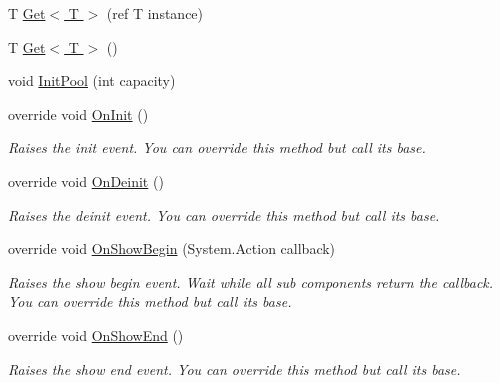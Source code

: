 \begin{DoxyCompactItemize}
\item 
T \hyperlink{class_unity_engine_1_1_u_i_1_1_windows_1_1_components_1_1_linker_component_a5469f90dba68bd5de121e36aac17409c}{Get$<$ T $>$} (ref T instance)
\item 
T \hyperlink{class_unity_engine_1_1_u_i_1_1_windows_1_1_components_1_1_linker_component_ab499a114ddf3ed1b9b5028811c0cbdd8}{Get$<$ T $>$} ()
\item 
void \hyperlink{class_unity_engine_1_1_u_i_1_1_windows_1_1_components_1_1_linker_component_a86d36fdfb784eab7e9771adc7090238b}{Init\+Pool} (int capacity)
\item 
override void \hyperlink{class_unity_engine_1_1_u_i_1_1_windows_1_1_components_1_1_linker_component_a39072092da7a1f52ca8a4e14785b6daf}{On\+Init} ()
\begin{DoxyCompactList}\small\item\em Raises the init event. You can override this method but call it\textquotesingle{}s base. \end{DoxyCompactList}\item 
override void \hyperlink{class_unity_engine_1_1_u_i_1_1_windows_1_1_components_1_1_linker_component_ace9cdc3dc7abebb32198cc935eda3164}{On\+Deinit} ()
\begin{DoxyCompactList}\small\item\em Raises the deinit event. You can override this method but call it\textquotesingle{}s base. \end{DoxyCompactList}\item 
override void \hyperlink{class_unity_engine_1_1_u_i_1_1_windows_1_1_components_1_1_linker_component_a421e90af11df6be04808bb34d0641289}{On\+Show\+Begin} (System.\+Action callback)
\begin{DoxyCompactList}\small\item\em Raises the show begin event. Wait while all sub components return the callback. You can override this method but call it\textquotesingle{}s base. \end{DoxyCompactList}\item 
override void \hyperlink{class_unity_engine_1_1_u_i_1_1_windows_1_1_components_1_1_linker_component_a81ed02e416deb23e30f1cf994acaaf2c}{On\+Show\+End} ()
\begin{DoxyCompactList}\small\item\em Raises the show end event. You can override this method but call it\textquotesingle{}s base. \end{DoxyCompactList}\item 

\end{DoxyCompactItemize}
